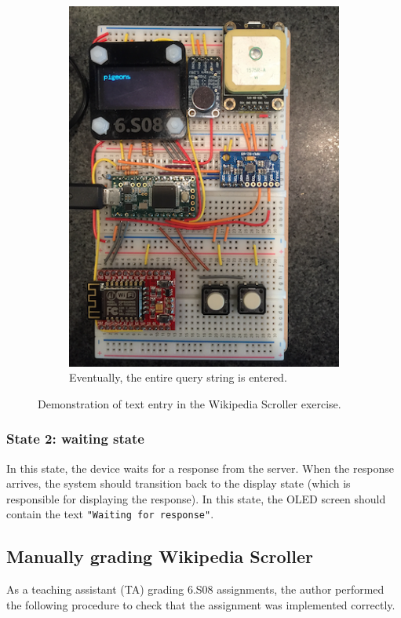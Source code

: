 \documentclass[12pt]{article}
\begin{document}
\begin{figure}
\begin{subfigure}[b]{.3\linewidth}
\includegraphics[width=\linewidth]{text-pigeons}
\caption{Eventually, the entire query string is entered.}
\label{fig:text-pigeons}
\end{subfigure}

\caption{Demonstration of text entry in the Wikipedia Scroller exercise.}
\label{fig:pigeon-entry}
\end{figure}

\subsubsection{State 2: waiting state}
In this state, the device waits for a response from the server.  When the response arrives, the system should transition back to the display state (which is responsible for displaying the response).  In this state, the OLED screen should contain the text \texttt{"Waiting for response"}.

\subsection{Manually grading Wikipedia Scroller}
As a teaching assistant (TA) grading 6.S08 assignments, the author performed the following procedure to check that the assignment was implemented correctly.
\end{document}
